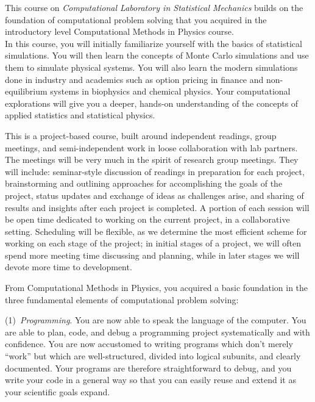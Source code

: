 \documentclass[12pt]{mcplain}
\begin{document}
This course on \emph{Computational Laboratory in Statistical Mechanics} builds on the foundation of computational problem solving that you acquired in the introductory level Computational Methods in Physics course.\\

In this course, you will initially familiarize yourself with the basics of statistical simulations. You will then learn the concepts of Monte Carlo simulations and use them to simulate physical systems. You will also learn the modern simulations done in industry and academics such as option pricing in finance and non-equilibrium systems in biophysics and chemical physics. Your computational explorations will give you a deeper, hands-on understanding of the concepts of applied statistics and statistical physics.



This is a project-based course, built around independent readings, group
meetings, and semi-independent work in loose collaboration with lab partners.
The meetings will be very much in the spirit of research group meetings.  They
will include: seminar-style discussion of readings in preparation for each
project, brainstorming and outlining approaches for accomplishing the goals of
the project, status updates and exchange of ideas as challenges arise, and
sharing of results and insights after each project is completed.  A portion of
each session will be open time dedicated to working on the current project, in a
collaborative setting.  Scheduling will be flexible, as we determine the most
efficient scheme for working on each stage of the project; in initial stages of
a project, we will often spend more meeting time discussing and planning, while
in later stages we will devote more time to development.

\clearpage


From Computational Methods in Physics, you acquired a basic foundation in the
three fundamental elements of computational problem solving:

(1)~\textit{Programming}. You are now able to speak the language of the
computer.  You are able to plan, code, and debug a programming project
systematically and with confidence.  You are now accustomed to writing programs
which don't merely ``work'' but which are well-structured, divided into logical
subunits, and clearly documented.  Your programs are therefore straightforward
to debug, and you write your code in a general way so that you can easily reuse
and extend it as your scientific goals expand.
\end{document}
